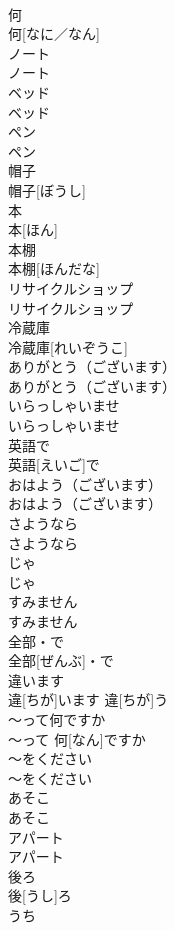 \documentclass[8pt]{extreport}
\begin{document}
\begin{CJK}{UTF8}{min}
\\	何	
\\	何[なに／なん]		
\\	ノート	
\\	ノート		
\\	ベッド	
\\	ベッド		
\\	ペン	
\\	ペン		
\\	帽子	
\\	帽子[ぼうし]		
\\	本	
\\	本[ほん]		
\\	本棚	
\\	本棚[ほんだな]		
\\	リサイクルショップ	
\\	リサイクルショップ		
\\	冷蔵庫	
\\	冷蔵庫[れいぞうこ]		
\\	ありがとう（ございます）	
\\	ありがとう（ございます）		
\\	いらっしゃいませ	
\\	いらっしゃいませ		
\\	英語で	
\\	英語[えいご]で		
\\	おはよう（ございます）	
\\	おはよう（ございます）		
\\	さようなら	
\\	さようなら		
\\	じゃ	
\\	じゃ		
\\	すみません	
\\	すみません		
\\	全部・で	
\\	全部[ぜんぶ]・で		
\\	違います	
\\	違[ちが]います	違[ちが]う	
\\	〜って何ですか	
\\	〜って 何[なん]ですか		
\\	〜をください	
\\	〜をください		
\\	あそこ	
\\	あそこ		
\\	アパート	
\\	アパート		
\\	後ろ	
\\	後[うし]ろ		
\\	うち	

\end{CJK}
\end{document}
